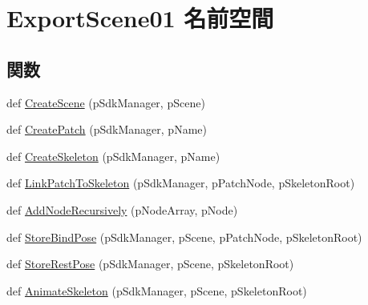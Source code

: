 \hypertarget{namespace_export_scene01}{}\section{Export\+Scene01 名前空間}
\label{namespace_export_scene01}
\subsection*{関数}
\begin{DoxyCompactItemize}
\item 
def \hyperlink{namespace_export_scene01_a405c93947107b07b27cb80d3c4712ef1}{Create\+Scene} (p\+Sdk\+Manager, p\+Scene)
\item 
def \hyperlink{namespace_export_scene01_a7465dc2df82a70a14fe71b8287dedfa5}{Create\+Patch} (p\+Sdk\+Manager, p\+Name)
\item 
def \hyperlink{namespace_export_scene01_a5259fc3c896eb260506c25926f104b52}{Create\+Skeleton} (p\+Sdk\+Manager, p\+Name)
\item 
def \hyperlink{namespace_export_scene01_a12065724eab3b0af37e5ac87cfa97c0a}{Link\+Patch\+To\+Skeleton} (p\+Sdk\+Manager, p\+Patch\+Node, p\+Skeleton\+Root)
\item 
def \hyperlink{namespace_export_scene01_aa186fbc04b0d0208f3cb0ede5520fa17}{Add\+Node\+Recursively} (p\+Node\+Array, p\+Node)
\item 
def \hyperlink{namespace_export_scene01_a7d99da67d243a6fd5092f8a00f751cc8}{Store\+Bind\+Pose} (p\+Sdk\+Manager, p\+Scene, p\+Patch\+Node, p\+Skeleton\+Root)
\item 
def \hyperlink{namespace_export_scene01_a67dba7f60fcb643e5c43940ed47dd820}{Store\+Rest\+Pose} (p\+Sdk\+Manager, p\+Scene, p\+Skeleton\+Root)
\item 
def \hyperlink{namespace_export_scene01_a9096c489c0a4ce8c2755775b58800ea8}{Animate\+Skeleton} (p\+Sdk\+Manager, p\+Scene, p\+Skeleton\+Root)
\end{DoxyCompactItemize}
